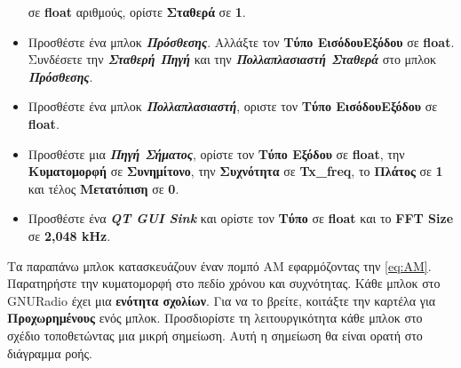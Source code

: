\documentclass[12pt]{report}
\begin{document}
\begin{itemize}
                    σε \textbf{float} αριθμούς, ορίστε \textbf{Σταθερά} σε \textbf{1}.
                \item Προσθέστε ένα μπλοκ \textbf{\textit{Πρόσθεσης}}. Αλλάξτε τον \textbf{Τύπο ΕισόδουΕξόδου}
                 σε \textbf{float}. Συνδέσετε την \textbf{\textit{Σταθερή Πηγή}} και την
                 \textbf{\textit{Πολλαπλασιαστή Σταθερά}} στο μπλοκ \textbf{\textit{Πρόσθεσης}}.
                \item Προσθέστε ένα μπλοκ \textbf{\textit{Πολλαπλασιαστή}}, οριστε τον 
                 \textbf{Τύπο ΕισόδουΕξόδου} σε \textbf{float}.
                \item Προσθέστε μια \textbf{\textit{Πηγή Σήματος}}, ορίστε τον \textbf{Τύπο Εξόδου} σε
                 \textbf{float}, την \textbf{Κυματομορφή} σε \textbf{Συνημίτονο}, την \textbf{Συχνότητα} σε
                 \textbf{Tx\_freq}, το \textbf{Πλάτος} σε \textbf{1} και τέλος \textbf{Μετατόπιση} σε \textbf{0}.
                \item Προσθέστε ένα \textbf{\textit{QT GUI Sink}} και ορίστε τον \textbf{Τύπο} σε
                 \textbf{float} και το \textbf{FFT Size} σε \textbf{2,048 kHz}.
            \end{itemize}

            Τα παραπάνω μπλοκ κατασκευάζουν έναν πομπό AM εφαρμόζοντας την \ref{eq:AM}.
            Παρατηρήστε την κυματομορφή στο πεδίο χρόνου και συχνότητας.
            Κάθε μπλοκ στο GNURadio έχει μια \textbf{ενότητα σχολίων}. Για να το βρείτε, κοιτάξτε την καρτέλα
            για \textbf{Προχωρημένους} ενός μπλοκ. Προσδιορίστε τη λειτουργικότητα κάθε μπλοκ 
            στο σχέδιο τοποθετώντας μια μικρή σημείωση. Αυτή η σημείωση θα είναι ορατή στο διάγραμμα ροής.
\end{document}
